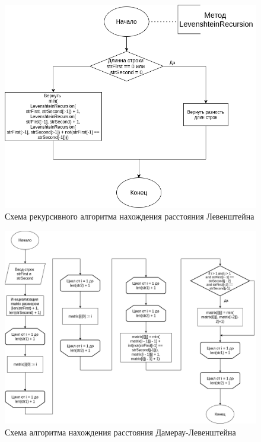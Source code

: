 \begin{figure}[h]
    \centering
    \includegraphics[width=180mm]{inc/img/diagramLevRec.png}
    \caption{Схема рекурсивного алгоритма нахождения расстояния Левенштейна}
    \label{img:diagramLevRec}
\end{figure}
  
  
\begin{figure}[h]
    \centering
    \includegraphics[width=180mm]{inc/img/diagramDamLev.png}
    \caption{Схема алгоритма нахождения расстояния Дамерау-Левенштейна}
    \label{img:diagramDamLev}
\end{figure}